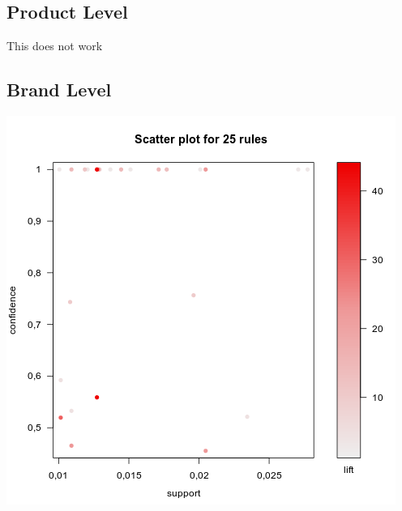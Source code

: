 \documentclass[12pt,a4paper,leqno]{report}
\theoremstyle{plain}
\theoremstyle{definition}
\theoremstyle{remark}
\begin{document}
\subsection{Product Level}

This does not work

\subsection{Brand Level}

\bigskip
{
    \centering
    \includegraphics[width=\textwidth,height=\textheight,keepaspectratio]{apriori_brand_level_plot.png}
    \par
}
\bigskip
\end{document}
